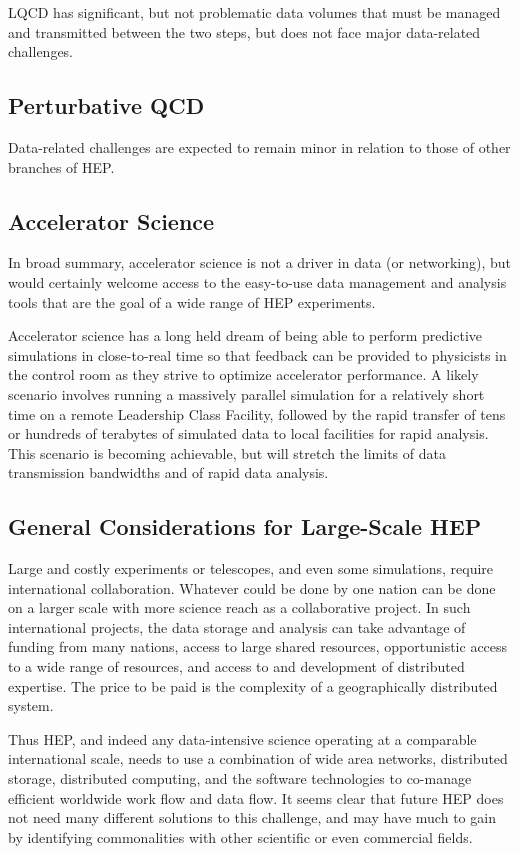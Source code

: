 LQCD has significant, but not problematic data volumes that must be managed and transmitted 
between the two steps, but does not face major data-related challenges.

\subsection{Perturbative QCD}
Data-related challenges are expected to remain minor in relation to those of other branches of HEP.

\subsection{Accelerator Science}
In broad summary, accelerator science is not a driver in data (or networking), but would 
certainly welcome access to the easy-to-use data management and analysis tools that are 
the goal of a wide range of HEP experiments.

Accelerator science has a long held dream of being able to perform predictive simulations 
in close-to-real time so that feedback can be provided to physicists in the control room as 
they strive to optimize accelerator performance.  A likely scenario involves running a massively 
parallel simulation for a relatively short time on a remote Leadership Class Facility, followed 
by the rapid transfer of tens or hundreds of terabytes of simulated data to local facilities 
for rapid analysis.  This scenario is becoming achievable, but will stretch the limits of data 
transmission bandwidths and of rapid data analysis.

\subsection{General Considerations for Large-Scale HEP}
Large and costly experiments or telescopes, and even some simulations, require 
international collaboration.  Whatever could be done by one nation can be done 
on a larger scale with more science reach as a collaborative project.  In such 
international projects, the data storage and analysis can take advantage of funding 
from many nations, access to large shared resources, opportunistic access to a wide 
range of resources, and access to and development of distributed expertise.  
The price to be paid is the complexity of a geographically distributed system.

Thus HEP, and indeed any data-intensive science operating at a comparable 
international scale, needs to use a combination of wide area networks, 
distributed storage, distributed computing, and the software technologies 
to co-manage efficient worldwide work flow and data flow.  It seems clear 
that future HEP does not need many different solutions to this challenge, 
and may have much to gain by identifying commonalities with other 
scientific or even commercial fields.

